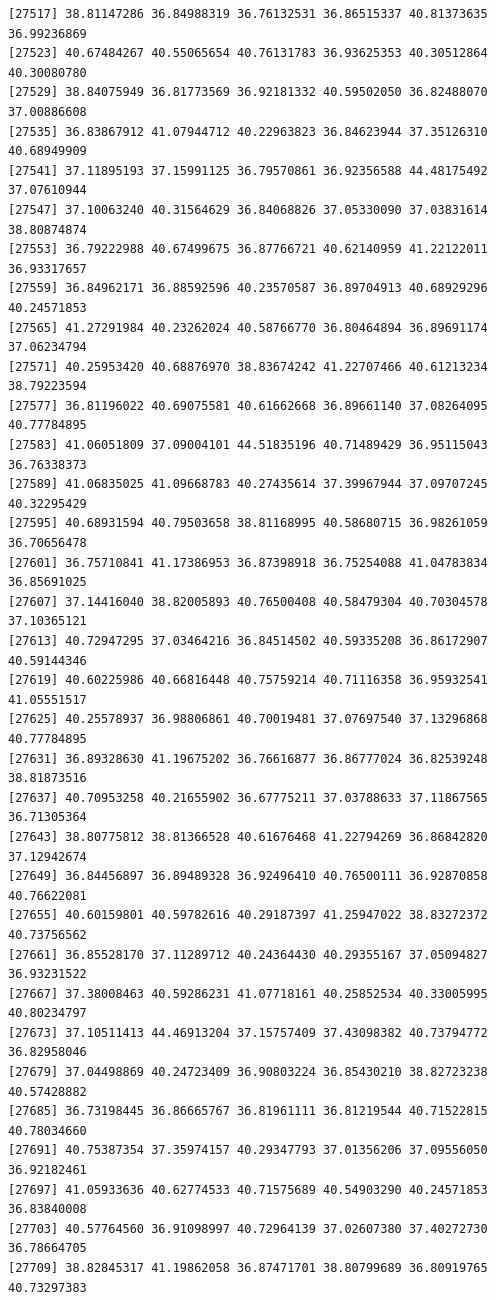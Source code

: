 \documentclass[
  letterpaper,
  DIV=11,
  numbers=noendperiod]{scrartcl}
\begin{document}
\begin{verbatim}
[27517] 38.81147286 36.84988319 36.76132531 36.86515337 40.81373635 36.99236869
[27523] 40.67484267 40.55065654 40.76131783 36.93625353 40.30512864 40.30080780
[27529] 38.84075949 36.81773569 36.92181332 40.59502050 36.82488070 37.00886608
[27535] 36.83867912 41.07944712 40.22963823 36.84623944 37.35126310 40.68949909
[27541] 37.11895193 37.15991125 36.79570861 36.92356588 44.48175492 37.07610944
[27547] 37.10063240 40.31564629 36.84068826 37.05330090 37.03831614 38.80874874
[27553] 36.79222988 40.67499675 36.87766721 40.62140959 41.22122011 36.93317657
[27559] 36.84962171 36.88592596 40.23570587 36.89704913 40.68929296 40.24571853
[27565] 41.27291984 40.23262024 40.58766770 36.80464894 36.89691174 37.06234794
[27571] 40.25953420 40.68876970 38.83674242 41.22707466 40.61213234 38.79223594
[27577] 36.81196022 40.69075581 40.61662668 36.89661140 37.08264095 40.77784895
[27583] 41.06051809 37.09004101 44.51835196 40.71489429 36.95115043 36.76338373
[27589] 41.06835025 41.09668783 40.27435614 37.39967944 37.09707245 40.32295429
[27595] 40.68931594 40.79503658 38.81168995 40.58680715 36.98261059 36.70656478
[27601] 36.75710841 41.17386953 36.87398918 36.75254088 41.04783834 36.85691025
[27607] 37.14416040 38.82005893 40.76500408 40.58479304 40.70304578 37.10365121
[27613] 40.72947295 37.03464216 36.84514502 40.59335208 36.86172907 40.59144346
[27619] 40.60225986 40.66816448 40.75759214 40.71116358 36.95932541 41.05551517
[27625] 40.25578937 36.98806861 40.70019481 37.07697540 37.13296868 40.77784895
[27631] 36.89328630 41.19675202 36.76616877 36.86777024 36.82539248 38.81873516
[27637] 40.70953258 40.21655902 36.67775211 37.03788633 37.11867565 36.71305364
[27643] 38.80775812 38.81366528 40.61676468 41.22794269 36.86842820 37.12942674
[27649] 36.84456897 36.89489328 36.92496410 40.76500111 36.92870858 40.76622081
[27655] 40.60159801 40.59782616 40.29187397 41.25947022 38.83272372 40.73756562
[27661] 36.85528170 37.11289712 40.24364430 40.29355167 37.05094827 36.93231522
[27667] 37.38008463 40.59286231 41.07718161 40.25852534 40.33005995 40.80234797
[27673] 37.10511413 44.46913204 37.15757409 37.43098382 40.73794772 36.82958046
[27679] 37.04498869 40.24723409 36.90803224 36.85430210 38.82723238 40.57428882
[27685] 36.73198445 36.86665767 36.81961111 36.81219544 40.71522815 40.78034660
[27691] 40.75387354 37.35974157 40.29347793 37.01356206 37.09556050 36.92182461
[27697] 41.05933636 40.62774533 40.71575689 40.54903290 40.24571853 36.83840008
[27703] 40.57764560 36.91098997 40.72964139 37.02607380 37.40272730 36.78664705
[27709] 38.82845317 41.19862058 36.87471701 38.80799689 36.80919765 40.73297383

\end{verbatim}
\end{document}
